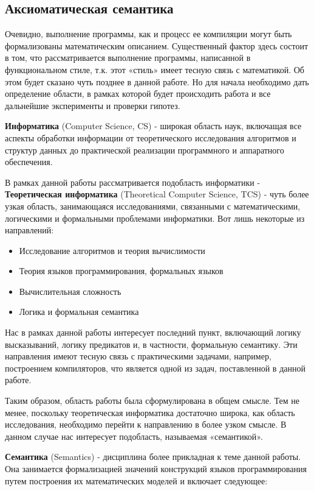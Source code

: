 \documentclass[a4paper,14pt]{extreport} %
\begin{document}
{\subsection{Аксиоматическая семантика}}

	Очевидно, выполнение программы, как и процесс ее компиляции могут быть формализованы математическим описанием. Существенный фактор здесь состоит в том, что рассматривается выполнение программы, написанной в функциональном стиле, т.к. этот «стиль» имеет тесную связь с математикой. Об этом будет сказано чуть позднее в данной работе. Но для начала необходимо дать определение области, в рамках которой будет происходить работа и все дальнейшие эксперименты и проверки гипотез.

	\textbf{Информатика} (Computer Science, CS) - широкая область наук, включащая все аспекты обработки информации от теоретического исследования алгоритмов и структур данных до практической реализации программного и аппаратного обеспечения.

	В рамках данной работы рассматривается подобласть информатики - \textbf{Теоретическая информатика} (Theoretical Computer Science, TCS) - чуть более узкая область, занимающаяся исследованиями, связанными с математическими, логическими и формальными проблемами информатики. Вот лишь некоторые из направлений:

\begin{itemize}
    \item Исследование алгоритмов и теория вычислимости
    \item Теория языков программирования, формальных языков
    \item Вычислительная сложность
    \item Логика и формальная семантика
\end{itemize}

Нас в рамках данной работы интересует последний пункт, включающий логику высказываний, логику предикатов и, в частности, формальную семантику. Эти направления имеют тесную связь с практическими задачами, например, построением компиляторов, что является одной из задач, поставленной в данной работе.

	Таким образом, область работы была сформулирована в общем смысле. Тем не менее, поскольку теоретическая информатика достаточно широка, как область исследования, необходимо перейти к направлению в более узком смысле. В данном случае нас интересует подобласть, называемая «семантикой».

	\textbf{Семантика} (Semantics) - дисциплина более прикладная к теме данной работы. Она занимается формализацией значений конструкций языков программирования путем построения их математических моделей и включает следующее:
\end{document}
